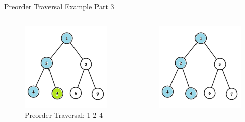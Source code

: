 \documentclass[aspectratio=169]{beamer}%
\begin{document}
\begin{frame}{Preorder Traversal Example Part 3}
    \begin{columns}
        \begin{column}{0.32\textwidth}
            \begin{figure}
                \centering
                \includegraphics[width = .9\linewidth]{tree-pre 7.png}
                \caption{Preorder Traversal: 1-2-4}
            \end{figure}
        \end{column}
        \hfill
        \begin{column}{0.32\textwidth}
            \begin{figure}
                \centering
                \includegraphics[width = .9\linewidth]{tree-pre 8.png}

\end{figure}
\end{column}
\end{columns}
\end{frame}
\end{document}
